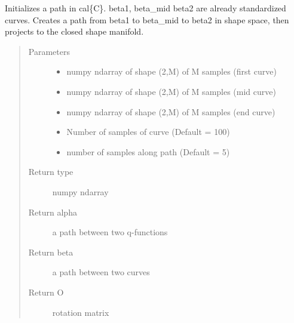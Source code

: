 \documentclass[letterpaper,10pt,english]{sphinxmanual}
\begin{document}
\begin{fulllineitems}
\label{\detokenize{geodesic:geodesic.init_path_rand}}
Initializes a path in cal\{C\}. beta1, beta\_mid beta2 are already
standardized curves. Creates a path from beta1 to beta\_mid to beta2 in
shape space, then projects to the closed shape manifold.
\begin{quote}\begin{description}
\item[{Parameters}] \leavevmode\begin{itemize}
\item {} 
 \textendash{} numpy ndarray of shape (2,M) of M samples (first curve)

\item {} 
 \textendash{} numpy ndarray of shape (2,M) of M samples (mid curve)

\item {} 
 \textendash{} numpy ndarray of shape (2,M) of M samples (end curve)

\item {} 
 \textendash{} Number of samples of curve (Default = 100)

\item {} 
 \textendash{} number of samples along path (Default = 5)

\end{itemize}

\item[{Return type}] \leavevmode
numpy ndarray

\item[{Return alpha}] \leavevmode
a path between two q-functions

\item[{Return beta}] \leavevmode
a path between two curves

\item[{Return O}] \leavevmode
rotation matrix

\end{description}\end{quote}

\end{fulllineitems}
\end{document}
